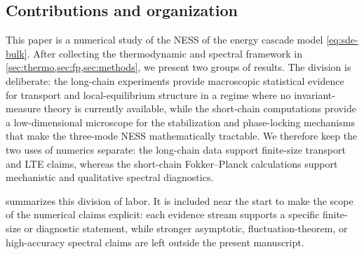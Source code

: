 \documentclass[11pt,a4paper]{article}
\theoremstyle{definition}
\numberwithin{equation}{section}   %
\begin{document}
\subsection{Contributions and organization}\label{sec:contributions}

This paper is a numerical study of the NESS of the energy cascade model
\eqref{eq:sde-bulk}. After collecting the thermodynamic and spectral framework in
\cref{sec:thermo,sec:fp,sec:methods}, we present two groups of results.
The division is deliberate: the long-chain experiments provide macroscopic
statistical evidence for transport and local-equilibrium structure in a regime
where no invariant-measure theory is currently available, while the short-chain
computations provide a low-dimensional microscope for the stabilization and
phase-locking mechanisms that make the three-mode NESS mathematically
tractable. We therefore keep the two uses of numerics separate: the long-chain
data support finite-size transport and LTE claims, whereas the short-chain
Fokker--Planck calculations support mechanistic and qualitative spectral
diagnostics.

 summarizes this division of labor. It is included
near the start to make the scope of the numerical claims explicit: each
evidence stream supports a specific finite-size or diagnostic statement, while
stronger asymptotic, fluctuation-theorem, or high-accuracy spectral claims are
left outside the present manuscript.
\end{document}
